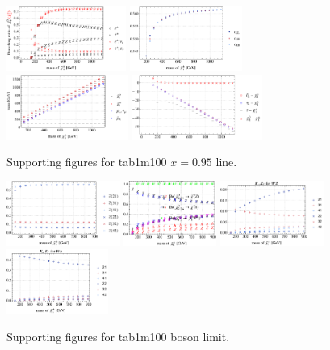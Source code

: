\documentclass[a4paper,10pt,captions=tableheading,DIV=14]{scrartcl}
\numberwithin{equation}{section}
\begin{document}
\begin{figure}[h!]\centering
 \includegraphics[height=60pt]{../plots/plot_tab1m100x095_br21.pdf}
 \includegraphics[height=60pt]{../plots/plot_tab1m100x095_cfactors.pdf}
 \includegraphics[height=60pt]{../plots/plot_tab1m100x095_mass.pdf}
 \includegraphics[height=60pt]{../plots/plot_tab1m100x095_massdiff.pdf}
\caption{Supporting figures for tab1m100 $x=0.95$ line.}
\end{figure}
\begin{figure}[h!]\centering
 \includegraphics[height=60pt]{../plots/plot_tab1m100boson_cfactors.pdf}
 \includegraphics[height=60pt]{../plots/plot_tab1m100boson_br.pdf}
 \includegraphics[height=60pt]{../plots/plot_tab1m100boson_WZ.pdf}
 \includegraphics[height=60pt]{../plots/plot_tab1m100boson_WH.pdf}
\caption{Supporting figures for tab1m100 boson limit.}
\end{figure}
\end{document}
